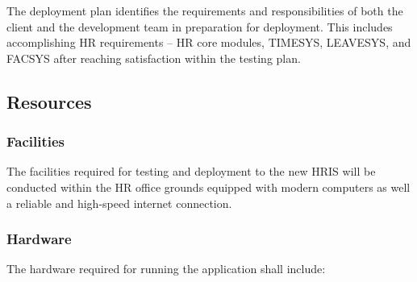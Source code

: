         The deployment plan identifies the requirements and responsibilities of both the client and the development team in preparation for deployment. This includes accomplishing HR requirements -- HR core modules, TIMESYS, LEAVESYS, and FACSYS after reaching satisfaction within the testing plan.

    \subsection{Resources}
        \subsubsection{Facilities}

        The facilities required for testing and deployment to the new HRIS will be conducted within the HR office grounds equipped with modern computers as well a reliable and high-speed internet connection.

        \subsubsection{Hardware}

        The hardware required for running the application shall include:

